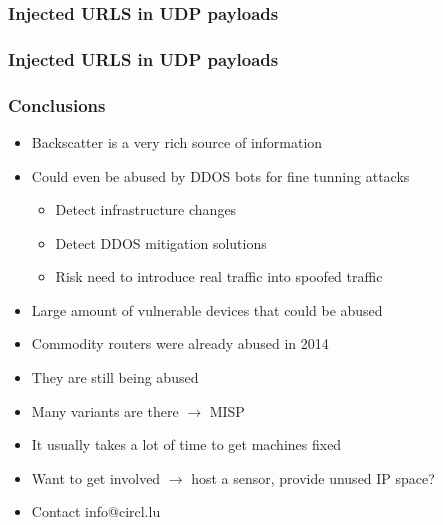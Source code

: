 \documentclass{beamer}
\begin{document}
\begin{frame}
    \frametitle{Injected URLS in UDP payloads}
    \begin{center}
    \end{center}
\end{frame}

\begin{frame}
    \frametitle{Injected URLS in UDP payloads}
    \begin{center}
    \end{center}
\end{frame}

\begin{frame}
\frametitle{Conclusions}
    \begin{itemize}
        \item Backscatter is a very rich source of information
        \item Could even be abused by DDOS bots for fine tunning attacks
        \begin{itemize}
            \item Detect infrastructure changes
            \item Detect DDOS mitigation solutions
            \item Risk need to introduce real traffic into spoofed traffic
        \end{itemize}
        \item Large amount of vulnerable devices that could be abused
        \item Commodity routers were already abused in 2014
        \item They are still being abused
        \item Many variants are there $\to$ MISP
        \item It usually takes a lot of time to get machines fixed
        \item Want to get involved $\to$ host a sensor, provide unused IP space?
        \item Contact info@circl.lu
    \end{itemize}
\end{frame}
\end{document}
